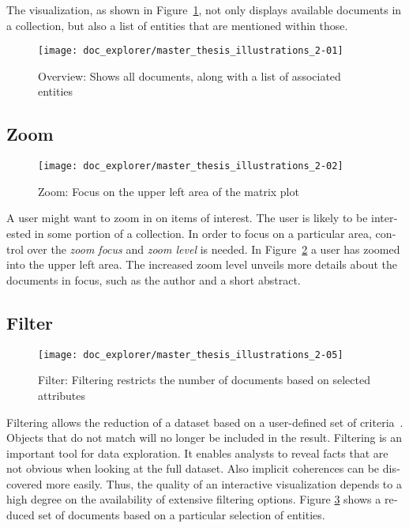 \begin{english}
The visualization, as shown in Figure~\ref{fig:overview}, not only displays available documents in a collection, but also a list of entities that are mentioned within those.

\begin{figure}
\centering
\texttt{[image: doc\_explorer/master\_thesis\_illustrations\_2-01]}
\caption{Overview: Shows all documents, along with a list of associated entities}
\label{fig:overview}
\end{figure}


\subsection{Zoom}

\begin{figure}
\centering
\texttt{[image: doc\_explorer/master\_thesis\_illustrations\_2-02]}
\caption{Zoom: Focus on the upper left area of the matrix plot}
\label{fig:zoom}
\end{figure}

A user might want to zoom in on items of interest. The user is likely to be interested in some portion of a collection. In order to focus on a particular area, control over the \emph{zoom focus} and \emph{zoom level} is needed. In Figure~\ref{fig:zoom} a user has zoomed into the upper left area. The increased zoom level unveils more details about the documents in focus, such as the author and a short abstract.

\subsection{Filter}

\begin{figure}
\centering
\texttt{[image: doc\_explorer/master\_thesis\_illustrations\_2-05]}
\caption{Filter: Filtering restricts the number of documents based on selected attributes}
\label{fig:filtering}
\end{figure}

Filtering allows the reduction of a dataset based on a user-defined set of criteria~\cite{Ahlberg92dynamicqueries}. Objects that do not match will no longer be included in the result. Filtering is an important tool for data exploration. It enables analysts to reveal facts that are not obvious when looking at the full dataset. Also implicit coherences can be discovered more easily. Thus, the quality of an interactive visualization depends to a high degree on the availability of extensive filtering options. Figure \ref{fig:filtering} shows a reduced set of documents based on a particular selection of entities.



\end{english}
